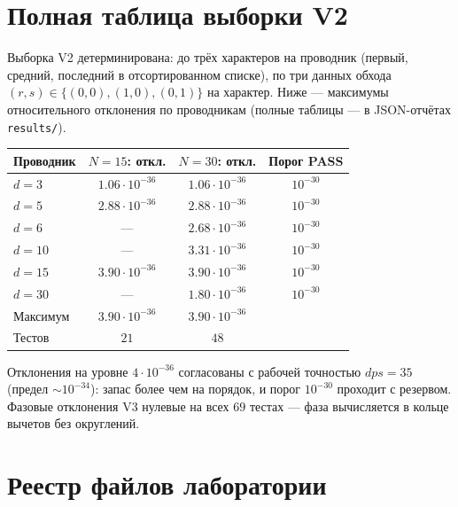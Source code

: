 
\section{Полная таблица выборки V2}\label{app:v2table}

Выборка V2 детерминирована: до трёх характеров на проводник
(первый, средний, последний в отсортированном списке), по три
данных обхода $(r,s)\in\{(0,0),(1,0),(0,1)\}$ на характер.
Ниже --- максимумы относительного отклонения по проводникам
(полные таблицы --- в JSON-отчётах \texttt{results/}).

\begin{center}
\small
\begin{tabular}{@{}l c c c@{}}
\toprule
Проводник & $N=15$: откл. & $N=30$: откл. & Порог PASS \\
\midrule
$d=3$  & $1.06\cdot10^{-36}$ & $1.06\cdot10^{-36}$ & $10^{-30}$ \\
$d=5$  & $2.88\cdot10^{-36}$ & $2.88\cdot10^{-36}$ & $10^{-30}$ \\
$d=6$  & ---                  & $2.68\cdot10^{-36}$ & $10^{-30}$ \\
$d=10$ & ---                  & $3.31\cdot10^{-36}$ & $10^{-30}$ \\
$d=15$ & $3.90\cdot10^{-36}$ & $3.90\cdot10^{-36}$ & $10^{-30}$ \\
$d=30$ & ---                  & $1.80\cdot10^{-36}$ & $10^{-30}$ \\
\midrule
Максимум & $3.90\cdot10^{-36}$ & $3.90\cdot10^{-36}$ & \\
Тестов & $21$ & $48$ & \\
\bottomrule
\end{tabular}
\end{center}

Отклонения на уровне $4\cdot10^{-36}$ согласованы с рабочей
точностью $dps=35$ (предел $\sim10^{-34}$): запас более чем на
порядок, и порог $10^{-30}$ проходит с резервом. Фазовые
отклонения V3 нулевые на всех $69$ тестах --- фаза вычисляется
в кольце вычетов без округлений.

\section{Реестр файлов лаборатории}\label{app:files}

